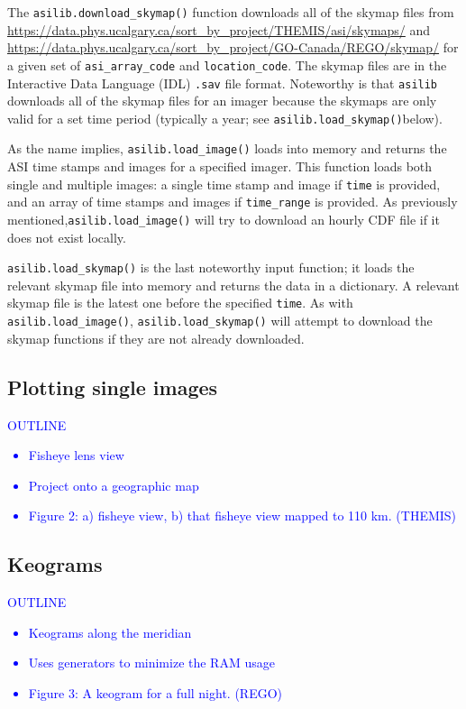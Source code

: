 \documentclass[draft]{agujournal2019}
\begin{document}
The \verb|asilib.download_skymap()| function downloads all of the skymap files from \url{https://data.phys.ucalgary.ca/sort_by_project/THEMIS/asi/skymaps/} and \url{https://data.phys.ucalgary.ca/sort_by_project/GO-Canada/REGO/skymap/} for a given set of \verb|asi_array_code| and \verb|location_code|. The skymap files are in the Interactive Data Language (IDL) \verb|.sav| file format. Noteworthy is that \verb|asilib| downloads all of the skymap files for an imager because the skymaps are only valid for a set time period (typically a year; see \verb|asilib.load_skymap()|below).

As the name implies, \verb|asilib.load_image()| loads into memory and returns the ASI time stamps and images for a specified imager. This function loads both single and multiple images: a single time stamp and image if \verb|time| is provided, and an array of time stamps and images if \verb|time_range| is provided. As previously mentioned,\verb|asilib.load_image()| will try to download an hourly CDF file if it does not exist locally.

\verb|asilib.load_skymap()| is the last noteworthy input function; it loads the relevant skymap file into memory and returns the data in a dictionary. A relevant skymap file is the latest one before the specified \verb|time|. As with \verb|asilib.load_image()|, \verb|asilib.load_skymap()| will attempt to download the skymap functions if they are not already downloaded.

\subsection{Plotting single images}
\textcolor{blue}{
      OUTLINE
      \begin{itemize}
            \item Fisheye lens view
            \item Project onto a geographic map
            \item Figure 2: a) fisheye view, b) that fisheye view mapped to 110 km. (THEMIS)
      \end{itemize}
}

\subsection{Keograms}
\textcolor{blue}{
      OUTLINE
      \begin{itemize}
            \item Keograms along the meridian
            \item Uses generators to minimize the RAM usage
            \item Figure 3: A keogram for a full night. (REGO)
      \end{itemize}
}
\end{document}
